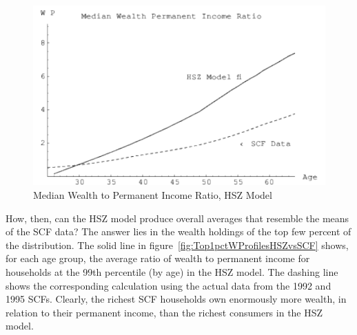 \documentclass[titlepage,12pt]{article}
\begin{document}
\begin{figure}
	\centerline{\includegraphics{./Figures/MedianWProfilesHSZvsSCF}}
	\caption{Median Wealth to Permanent Income Ratio, HSZ Model}
	\label{fig:MedianWProfilesHSZvsSCF}
\end{figure}


How, then, can the HSZ model produce overall averages that resemble 
the means of the SCF data?  The answer lies in the wealth holdings of 
the top few percent of the distribution.  The solid line in 
figure~\ref{fig:Top1pctWProfilesHSZvsSCF} shows, for each age group, 
the average ratio of wealth to permanent income for households at the 
99th percentile (by age) in the HSZ model.  The dashing line shows the 
corresponding calculation using the actual data from the 1992 and 1995 
SCFs.  Clearly, the richest SCF households own enormously more wealth, 
in relation to their permanent income, than the richest consumers in 
the HSZ model.

\end{document}
